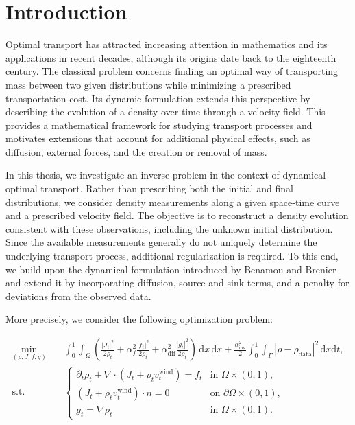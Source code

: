 \section{Introduction}



Optimal transport has attracted increasing attention in mathematics and its applications in recent decades, although its origins date back to the eighteenth century. The classical problem concerns finding an optimal way of transporting mass between two given distributions while minimizing a prescribed transportation cost. Its dynamic formulation extends this perspective by describing the evolution of a density over time through a velocity field. This provides a mathematical framework for studying transport processes and motivates extensions that account for additional physical effects, such as diffusion, external forces, and the creation or removal of mass.

In this thesis, we investigate an inverse problem in the context of dynamical optimal transport. Rather than prescribing both the initial and final distributions, we consider density measurements along a given space-time curve and a prescribed velocity field. The objective is to reconstruct a density evolution consistent with these observations, including the unknown initial distribution. Since the available measurements generally do not uniquely determine the underlying transport process, additional regularization is required. To this end, we build upon the dynamical formulation introduced by Benamou and Brenier and extend it by incorporating diffusion, source and sink terms, and a penalty for deviations from the observed data.

More precisely, we consider the following optimization problem:

\[
\begin{aligned}
\min_{(\rho,J,f,g)}\quad
&\int_0^1\int_\Omega
\left(
\frac{|J_t|^2}{2\rho_t}
+\alpha_f^2\frac{|f_t|^2}{2\rho_t}
+\alpha_{\mathrm{dif}}^2\frac{|g_t|^2}{2\rho_t}
\right)\,\mathrm dx\,\mathrm dx +\frac{\alpha_{\mathrm{inv}}^2}{2}
\int_0^1\int_\Gamma|\rho-\rho_{\mathrm{data}}|^2\,\mathrm d x \mathrm d t,\\[4pt]
\text{s.t.}\quad
&\begin{cases}
\partial_t\rho_t+\nabla\cdot(J_t+\rho_t v_t^{\mathrm{wind}})=f_t
&\text{in }\Omega\times(0,1),\\
(J_t+\rho_t v_t^{\mathrm{wind}})\cdot n=0
&\text{on }\partial\Omega\times(0,1),\\
g_t=\nabla\rho_t
&\text{in }\Omega\times(0,1).
\end{cases}
\end{aligned}
\]

